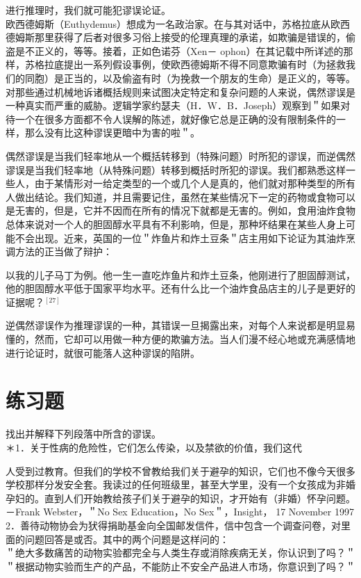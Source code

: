 进行推理时，我们就可能犯谬误论证。\\
欧西德姆斯（Euthydemus）想成为一名政治家。在与其对话中，苏格拉底从欧西德姆斯那里获得了后者对很多习俗上接受的伦理真理的承诺，如欺骗是错误的，偷盗是不正义的，等等。接着，正如色诺芬（Xen－ ophon）在其记载中所详述的那样，苏格拉底提出一系列假设事例，使欧西德姆斯不得不同意欺骗有时（为拯救我们的同胞）是正当的，以及偷盗有时（为挽救一个朋友的生命）是正义的，等等。对那些通过机械地诉诸概括规则来试图决定特定和复杂问题的人来说，偶然谬误是一种真实而严重的威胁。逻辑学家约瑟夫（H．W．B．Joseph）观察到＂如果对待一个在很多方面都不令人误解的陈述，就好像它总是正确的没有限制条件的一样，那么没有比这种谬误更暗中为害的啦＂。

偶然谬误是当我们轻率地从一个概括转移到（特殊问题）时所犯的谬误，而逆偶然谬误是当我们轻率地（从特殊问题）转移到概括时所犯的谬误。我们都熟悉这样一些人，由于某情形对一给定类型的一个或几个人是真的，他们就对那种类型的所有人做出结论。我们知道，并且需要记住，虽然在某些情况下一定的药物或食物可以是无害的，但是，它并不因而在所有的情况下就都是无害的。例如，食用油炸食物总体来说对一个人的胆固醇水平具有不利影响，但是，那种坏结果在某些人身上可能不会出现。近来，英国的一位＂炸鱼片和炸土豆条＂店主用如下论证为其油炸烹调方法的正当做了辩护：

\begin{displayquote}
以我的儿子马丁为例。他一生一直吃炸鱼片和炸土豆条，他刚进行了胆固醇测试，他的胆固醇水平低于国家平均水平。还有什么比一个油炸食品店主的儿子是更好的证据呢？${ }^{[27]}$
\end{displayquote}

逆偶然谬误作为推理谬误的一种，其错误一旦揭露出来，对每个人来说都是明显易懂的，然而，它却可以用做一种方便的欺骗方法。当人们漫不经心地或充满感情地进行论证时，就很可能落人这种谬误的陷阱。

\section*{练习题}
找出并解释下列段落中所含的谬误。\\
＊1．关于性病的危险性，它们怎么传染，以及禁欲的价值，我们这代

人受到过教育。但我们的学校不曾教给我们关于避孕的知识，它们也不像今天很多学校那样分发安全套。我读过的任何班级里，甚至大学里，没有一个女孩成为非婚孕妇的。直到人们开始教给孩子们关于避孕的知识，才开始有（非婚）怀孕问题。\\
－Frank Webster，＂No Sex Education，No Sex＂，Insight， 17 November 1997\\
2．善待动物协会为犾得捐助基金向全国邮发信件，信中包含一个调查问卷，对里面的问题回答是或否。其中的两个问题是这样问的：\\
＂绝大多数痛苦的动物实验都完全与人类生存或消除疾病无关，你认识到了吗？＂\\
＂根据动物实验而生产的产品，不能防止不安全产品进人市场，你意识到了吗？＂

